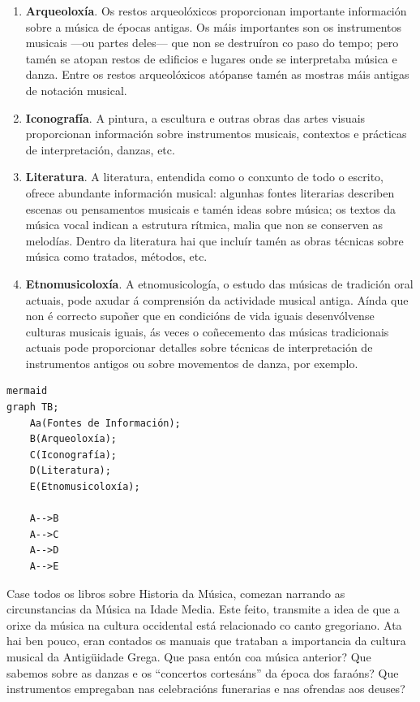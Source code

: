 \documentclass[a4paper, twoside]{templates/ociamthesis}
\providecommand{\tightlist}{%
  \setlength{\itemsep}{0pt}\setlength{\parskip}{0pt}}
\begin{document}
\begin{enumerate}
\def\labelenumi{\arabic{enumi}.}
\tightlist
\item
  \textbf{Arqueoloxía}. Os restos arqueolóxicos proporcionan importante información sobre a música de épocas antigas. Os máis importantes son os instrumentos musicais ---ou partes deles--- que non se destruíron co paso do tempo; pero tamén se atopan restos de edificios e lugares onde se interpretaba música e danza. Entre os restos arqueolóxicos atópanse tamén as mostras máis antigas de notación musical.
\item
  \textbf{Iconografía}. A pintura, a escultura e outras obras das artes visuais proporcionan información sobre instrumentos musicais, contextos e prácticas de interpretación, danzas, etc.
\item
  \textbf{Literatura}. A literatura, entendida como o conxunto de todo o escrito, ofrece abundante información musical: algunhas fontes literarias describen escenas ou pensamentos musicais e tamén ideas sobre música; os textos da música vocal indican a estrutura rítmica, malia que non se conserven as melodías. Dentro da literatura hai que incluír tamén as obras técnicas sobre música como tratados, métodos, etc.
\item
  \textbf{Etnomusicoloxía}. A etnomusicología, o estudo das músicas de tradición oral actuais, pode axudar á comprensión da actividade musical antiga. Aínda que non é correcto supoñer que en condicións de vida iguais desenvólvense culturas musicais iguais, ás veces o coñecemento das músicas tradicionais actuais pode proporcionar detalles sobre técnicas de interpretación de instrumentos antigos ou sobre movementos de danza, por exemplo.
\end{enumerate}

\begin{verbatim}
mermaid
graph TB;
    Aa(Fontes de Información);
    B(Arqueoloxía);
    C(Iconografía);
    D(Literatura);
    E(Etnomusicoloxía);
    
    A-->B
    A-->C
    A-->D
    A-->E
\end{verbatim}

Case todos os libros sobre Historia da Música, comezan narrando as circunstancias da Música na Idade Media. Este feito, transmite a idea de que a orixe da música na cultura occidental está relacionado co canto gregoriano. Ata hai ben pouco, eran contados os manuais que trataban a importancia da cultura musical da Antigüidade Grega. Que pasa entón coa música anterior? Que sabemos sobre as danzas e os ``concertos cortesáns'' da época dos faraóns? Que instrumentos empregaban nas celebracións funerarias e nas ofrendas aos deuses?
\end{document}
